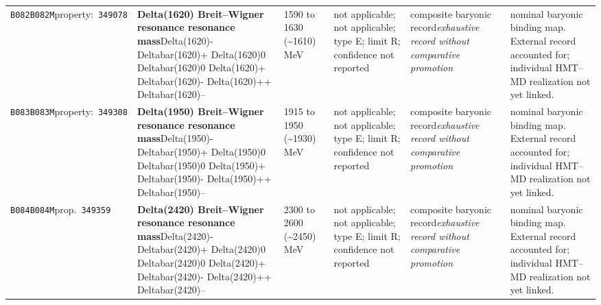 \begin{landscape}
\begin{longtable}{L{1.85cm}L{4.45cm}L{2.35cm}L{4.05cm}L{3.35cm}L{7.15cm}}
\texttt{B082}\newline \texttt{B082M}\newline property:\ \texttt{349078} & \textbf{Delta(1620) Breit--Wigner resonance resonance mass}\newline Delta(1620)- \textbar{}\allowbreak{} Deltabar(1620)+ \textbar{}\allowbreak{} Delta(1620)0 \textbar{}\allowbreak{} Deltabar(1620)0 \textbar{}\allowbreak{} Delta(1620)+ \textbar{}\allowbreak{} Deltabar(1620)- \textbar{}\allowbreak{} Delta(1620)++ \textbar{}\allowbreak{} Deltabar(1620)-- & 1590 to 1630 (\textasciitilde{}1610)\,MeV & not applicable; not applicable; type E; limit R; confidence not reported & composite baryonic record\newline \emph{exhaustive record without comparative promotion} & nominal baryonic binding map. External record accounted for; individual HMT--MD realization not yet linked. \\
\texttt{B083}\newline \texttt{B083M}\newline property:\ \texttt{349308} & \textbf{Delta(1950) Breit--Wigner resonance resonance mass}\newline Delta(1950)- \textbar{}\allowbreak{} Deltabar(1950)+ \textbar{}\allowbreak{} Delta(1950)0 \textbar{}\allowbreak{} Deltabar(1950)0 \textbar{}\allowbreak{} Delta(1950)+ \textbar{}\allowbreak{} Deltabar(1950)- \textbar{}\allowbreak{} Delta(1950)++ \textbar{}\allowbreak{} Deltabar(1950)-- & 1915 to 1950 (\textasciitilde{}1930)\,MeV & not applicable; not applicable; type E; limit R; confidence not reported & composite baryonic record\newline \emph{exhaustive record without comparative promotion} & nominal baryonic binding map. External record accounted for; individual HMT--MD realization not yet linked. \\
\texttt{B084}\newline \texttt{B084M}\newline prop.\ \texttt{349359} & \textbf{Delta(2420) Breit--Wigner resonance resonance mass}\newline Delta(2420)- \textbar{}\allowbreak{} Deltabar(2420)+ \textbar{}\allowbreak{} Delta(2420)0 \textbar{}\allowbreak{} Deltabar(2420)0 \textbar{}\allowbreak{} Delta(2420)+ \textbar{}\allowbreak{} Deltabar(2420)- \textbar{}\allowbreak{} Delta(2420)++ \textbar{}\allowbreak{} Deltabar(2420)-- & 2300 to 2600 (\textasciitilde{}2450)\,MeV & not applicable; not applicable; type E; limit R; confidence not reported & composite baryonic record\newline \emph{exhaustive record without comparative promotion} & nominal baryonic binding map. External record accounted for; individual HMT--MD realization not yet linked. \\

\end{longtable}
\end{landscape}
